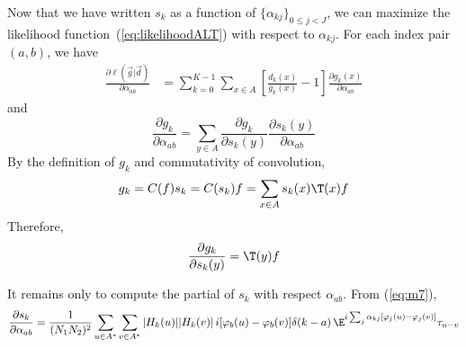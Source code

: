 Now that we have written $s_k$ as a function of $\{\alpha_{kj}\}_{0\leq j < J}$, we can
maximize the likelihood function~(\ref{eq:likelihoodALT}) with respect to
$\alpha_{kj}$. For each index pair $(a,b)$, we have
\begin{align*}
\frac{\partial \ell\left(\vec{g} |\vec{d}\right)}{\partial \alpha_{ab}}  
&= \sum_{k=0}^{K-1} \sum_{x\in A} \left[ \frac{ d_k(x)}{g_k(x)} - 1\right] \frac{\partial g_k(x)}{\partial \alpha_{ab}} 
\end{align*}
and
\begin{equation}\label{eq:m4}
\frac{\partial g_k}{\partial \alpha_{ab}}= \sum_{y\in A} \frac{\partial g_k}{\partial s_k(y)}
\frac{\partial s_k(y)}{\partial \alpha_{ab}} 
\end{equation}
By the definition of $g_k$ and commutativity of convolution,
\[ g_k = C(f)s_k =C(s_k)f = \sum_{x\in A} s_k(x)\T(x)f \]
Therefore,
\begin{equation}\label{eq:m5}
\frac{\partial g_k}{\partial s_k(y)} = \T(y)f
\end{equation}

It remains only to compute the partial of $s_k$ with respect
$\alpha_{ab}$. From (\ref{eq:m7}),
\[
\frac{\partial s_k}{\partial \alpha_{ab}}  = 
\frac{1}{(N_1N_2)^2}\sum_{u\in A^*} \sum_{v\in A^*}  |H_k(u)||H_k(v)|\,i[\varphi_b(u)-\varphi_b(v)]\delta(k-a)
\,\E^{ i\sum_j \alpha_{kj}[\varphi_j(u)-\varphi_j(v)]} \tau_{u-v}
\]

